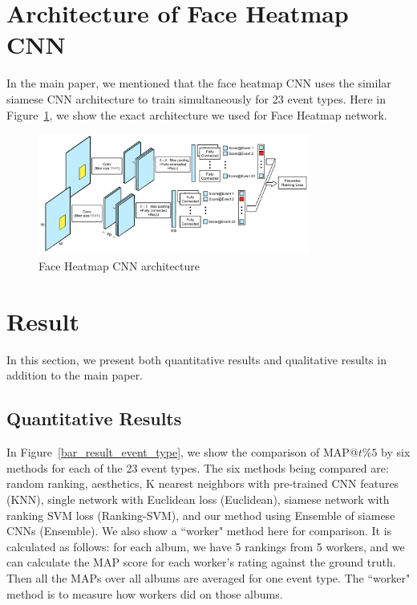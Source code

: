 \documentclass[10pt,twocolumn,letterpaper]{article}
\begin{document}
\section{Architecture of Face Heatmap CNN}
In the main paper, we mentioned that the face heatmap CNN uses the similar siamese CNN architecture to train simultaneously for 23 event types. Here in Figure~\ref{face_figure}, we show the exact architecture we used for Face Heatmap network. 

\begin{figure}[ht]
\begin{center}
\includegraphics[width=0.8\textwidth]{face_heatmap}
\end{center}
\caption{Face Heatmap CNN architecture}
\label{face_figure}
\end{figure}

\section{Result}
In this section, we present both quantitative results and qualitative results in addition to the main paper. 
\subsection{Quantitative Results}
In Figure~\ref{bar_result_event_type}, we show the comparison of $\text{MAP}@t\%5$ by six methods for each of the 23 event types. The six methods being compared are: random ranking, aesthetics, K nearest neighbors with pre-trained CNN features (KNN), single network with Euclidean loss (Euclidean), siamese network with ranking SVM loss (Ranking-SVM), and our method using Ensemble of siamese CNNs (Ensemble). We also show a ``worker" method here for comparison. It is calculated as follows: for each album, we have 5 rankings from 5 workers, and we can calculate the MAP score for each worker's rating against the ground truth. Then all the MAPs over all albums are averaged for one event type. The ``worker" method is to measure how workers did on those albums.
\end{document}
